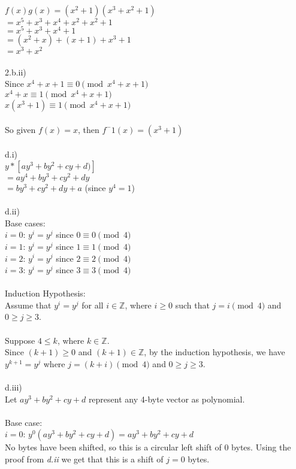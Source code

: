 \documentclass{assignment}
\newcommand\tab[1][0.5cm]{\hspace*{#1}}
\begin{document}
\begin{problemlist}
\begin{problem}
\begin{answer}
$f(x)g(x)=(x^2+1)(x^3+x^2+1)$\\
$=x^5+x^3+x^4+x^2+x^2+1$\\
$=x^5+x^3+x^4+1$\\
$=(x^2+x)+(x+1)+x^3+1$\\
$=x^3+x^2$\\
\\
2.b.ii)\\
Since $x^4+x+1\equiv 0  \pmod{x^4+x+1}$\\
$x^4+x\equiv 1  \pmod{x^4+x+1}$\\
$x(x^3+1)\equiv 1  \pmod{x^4+x+1}$\\
\\
So given $f(x)=x$, then $f^-1(x)=(x^3+1)$\\
\\
d.i)\\
$y*[ay^3+by^2+cy+d)]$\\
$=ay^4+by^3+cy^2+dy$\\
$=by^3+cy^2+dy+a$ (since $y^4=1$)\\
\\
d.ii)\\
Base cases:\\
$i=0$: $y^i=y^j$ since $0\equiv 0 \pmod 4$\\
$i=1$: $y^i=y^j$ since $1\equiv 1 \pmod 4$\\
$i=2$: $y^i=y^j$ since $2\equiv 2 \pmod 4$\\
$i=3$: $y^i=y^j$ since $3\equiv 3 \pmod 4$\\
\\
Induction Hypothesis:\\
Assume that $y^i=y^j$ for all $i\in \mathbb{Z}$, where $i \geq 0$ such that $j=i \pmod 4$ and $0\geq j \geq 3$.\\
\\
Suppose $4 \leq k$, where $k\in \mathbb{Z}$.\\
Since $(k+1) \geq 0$ and $(k+1) \in \mathbb{Z}$, by the induction hypothesis, we have $y^{k+1}=y^j$ where $j=(k+i)\pmod 4$ and $0\geq j \geq 3$.\\ 
\\
d.iii)\\
Let $ay^3+by^2+cy+d$ represent any 4-byte vector as polynomial.\\
\\
Base case:\\
$i=0$: $y^0(ay^3+by^2+cy+d)=ay^3+by^2+cy+d$ \\
\tab No bytes have been shifted, so this is a circular left shift of 0 bytes. Using the proof from \emph{d.ii} we get that this is a shift of $j=0$ bytes. \\

\end{answer}
\end{problem}
\end{problemlist}
\end{document}

